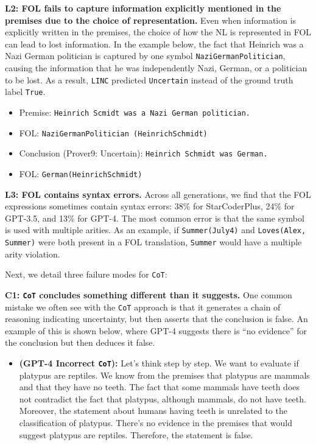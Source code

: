 \documentclass[11pt]{article}
\begin{document}
\textbf{L2: FOL fails to capture information explicitly mentioned in the premises due to the choice of representation.} Even when information is explicitly written in the premises, the choice of how the NL is represented in FOL can lead to lost information. In the example below, the fact that Heinrich was a Nazi German politician is captured by one symbol \texttt{NaziGermanPolitician}, causing the information that he was independently Nazi, German, or a politician to be lost.
As a result, \texttt{LINC} predicted \texttt{Uncertain} instead of the ground truth label \texttt{True}.

\begin{itemize}
\itemsep0.1em
    \item[] \small Premise: \texttt{Heinrich Scmidt was a Nazi German politician.}
    \item[] \small FOL: \texttt{NaziGermanPolitician (HeinrichSchmidt)}
    \item[] \small Conclusion (Prover9: Uncertain): \texttt{Heinrich Schmidt was German.}
    \item[] \small FOL: \texttt{German(HeinrichSchmidt)}
\end{itemize}

\textbf{L3: FOL contains syntax errors.}  Across all generations, we find that the FOL expressions sometimes contain syntax errors: 38\% for StarCoderPlus, 24\% for GPT-3.5, and 13\% for GPT-4. The most common error is that the same symbol is used with multiple arities. As an example, if \texttt{Summer(July4)} and \texttt{Loves(Alex, Summer)} were both present in a FOL translation, \texttt{Summer} would have a multiple arity violation.

Next, we detail three failure modes for \texttt{CoT}:

\textbf{C1: \texttt{CoT} concludes something different than it suggests.} One common mistake we often see with the \texttt{CoT} approach is that it generates a chain of reasoning indicating uncertainty, but then asserts that the conclusion is false. An example of this is shown below, where GPT-4 suggests there is ``no evidence'' for the conclusion but then deduces it false.

\begin{itemize}
\itemsep0.1em
    \item[] \small \textbf{(GPT-4 Incorrect \texttt{CoT}):} Let's think step by step. We want to evaluate if platypus are reptiles. We know from the premises that platypus are mammals and that they have no teeth. The fact that some mammals have teeth does not contradict the fact that platypus, although mammals, do not have teeth. Moreover, the statement about humans having teeth is unrelated to the classification of platypus. There's no evidence in the premises that would suggest platypus are reptiles. Therefore, the statement is false.
\end{itemize}
\end{document}
